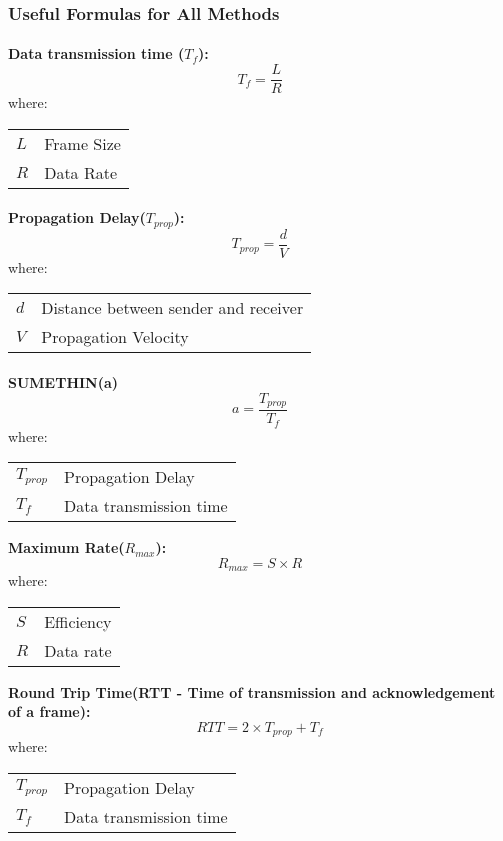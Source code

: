 \documentclass[../resumosRCOM.tex]{subfiles}
\makeatletter
\newenvironment{conditions}
  {\par\vspace{\abovedisplayskip}\noindent\begin{tabular}{>{$}l<{$} @{${}={}$} l}}
  {\end{tabular}\par\vspace{\belowdisplayskip}}
\makeatother
\begin{document}
\subsubsection{Useful Formulas for All Methods}

\paragraph{}
\textbf{Data transmission time ($T_f$):}
\begin{equation}
    {T_f}=\frac{L}{R}
\end{equation}
where:
\begin{conditions}
   L     &   Frame Size\\
   R &  Data Rate 
\end{conditions}

\paragraph{}
\textbf{Propagation Delay($T_{prop}$):}
\begin{equation}
    {T_{prop}}=\frac{d}{V}
\end{equation}
where:
\begin{conditions}
   d     &   Distance between sender and receiver \\
   V &  Propagation Velocity
\end{conditions}

\paragraph{}
\textbf{SUMETHIN(a)}
\begin{equation}
    {a}=\frac{T_{prop}}{T_f}
\end{equation}
where:
\begin{conditions}
    T_{prop}    &  Propagation Delay \\
   T_f     &  Data transmission time 
\end{conditions}

\textbf{Maximum Rate($R_{max}$):}
\begin{equation}
    {R_{max}}={S}\times{R}
\end{equation}
where:
\begin{conditions}
   S     &  Efficiency\\
   R &  Data rate
\end{conditions}

\textbf{Round Trip Time(RTT - Time of transmission and acknowledgement of a frame):} 
\begin{equation}
    {RTT}= 2 \times {T_{prop}} + {T_f}
\end{equation}
where:
\begin{conditions}
   T_{prop}     &  Propagation Delay\\
   T_f &   Data transmission time
\end{conditions}
\end{document}
